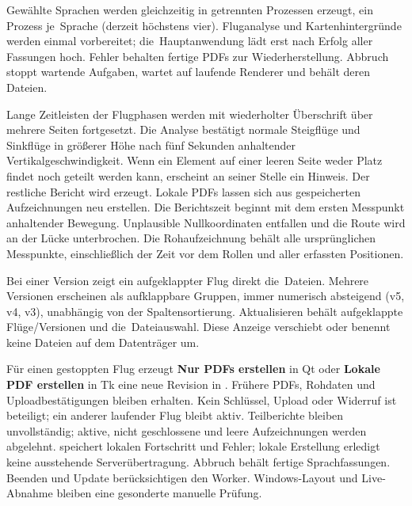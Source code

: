 \documentclass[11pt,a4paper]{article}
\newcommand{\filepath}[1]{\path{#1}}
\newcommand{\ui}[1]{\textbf{#1}}
\begin{document}
Gewählte Sprachen werden gleichzeitig in getrennten Prozessen erzeugt, ein
Prozess je~Sprache (derzeit höchstens vier). Fluganalyse und Kartenhintergründe
werden einmal vorbereitet; die~Hauptanwendung lädt erst nach Erfolg aller
Fassungen hoch. Fehler behalten fertige PDFs zur Wiederherstellung. Abbruch
stoppt wartende Aufgaben, wartet auf laufende Renderer und behält deren Dateien.

Lange Zeitleisten der Flugphasen werden mit wiederholter Überschrift über
mehrere Seiten fortgesetzt. Die Analyse bestätigt normale Steigflüge und
Sinkflüge in größerer Höhe nach fünf Sekunden anhaltender Vertikalgeschwindigkeit.
Wenn ein Element auf einer leeren Seite weder Platz findet noch geteilt werden
kann, erscheint an seiner Stelle ein Hinweis. Der restliche Bericht wird
erzeugt. Lokale PDFs lassen sich aus gespeicherten Aufzeichnungen neu erstellen.
Die Berichtszeit beginnt mit dem ersten Messpunkt anhaltender Bewegung.
Unplausible Nullkoordinaten entfallen und die Route wird an der Lücke
unterbrochen. Die Rohaufzeichnung behält alle ursprünglichen Messpunkte,
einschließlich der Zeit vor dem Rollen und aller erfassten Positionen.

Bei einer Version zeigt ein aufgeklappter Flug direkt die~Dateien. Mehrere
Versionen erscheinen als aufklappbare Gruppen, immer numerisch absteigend
(v5, v4, v3), unabhängig von der Spaltensortierung. Aktualisieren behält
aufgeklappte Flüge/Versionen und die~Dateiauswahl. Diese Anzeige verschiebt
oder benennt keine Dateien auf dem Datenträger um.

Für einen gestoppten Flug erzeugt \ui{Nur PDFs erstellen} in Qt oder
\ui{Lokale PDF erstellen} in Tk eine neue Revision in
\filepath{reports/}. Frühere PDFs, Rohdaten und Uploadbestätigungen
bleiben erhalten. Kein Schlüssel, Upload oder Widerruf ist beteiligt; ein
anderer laufender Flug bleibt aktiv. Teilberichte bleiben unvollständig;
aktive, nicht geschlossene und leere Aufzeichnungen werden abgelehnt.
\filepath{manual-report.json} speichert lokalen Fortschritt und Fehler;
lokale Erstellung erledigt keine ausstehende Serverübertragung. Abbruch
behält fertige Sprachfassungen. Beenden und Update berücksichtigen den Worker.
Windows-Layout und Live-Abnahme bleiben eine gesonderte manuelle Prüfung.
\end{document}
